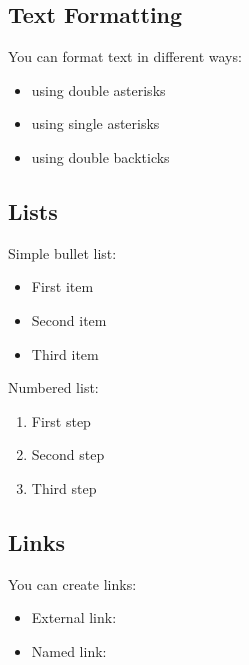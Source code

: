 \documentclass[letterpaper,10pt,english]{sphinxmanual}
\begin{document}
\subsection{Text Formatting}
\label{\detokenize{basic-elements:text-formatting}}
\sphinxAtStartPar
You can format text in different ways:
\begin{itemize}
\item {} 
\sphinxAtStartPar
{} using double asterisks

\item {} 
\sphinxAtStartPar
{} using single asterisks

\item {} 
\sphinxAtStartPar
{} using double backticks

\end{itemize}


\subsection{Lists}
\label{\detokenize{basic-elements:lists}}
\sphinxAtStartPar
Simple bullet list:
\begin{itemize}
\item {} 
\sphinxAtStartPar
First item

\item {} 
\sphinxAtStartPar
Second item

\item {} 
\sphinxAtStartPar
Third item

\end{itemize}

\sphinxAtStartPar
Numbered list:
\begin{enumerate}
%
\item {} 
\sphinxAtStartPar
First step

\item {} 
\sphinxAtStartPar
Second step

\item {} 
\sphinxAtStartPar
Third step

\end{enumerate}


\subsection{Links}
\label{\detokenize{basic-elements:links}}
\sphinxAtStartPar
You can create links:
\begin{itemize}
\item {} 
\sphinxAtStartPar
External link: 

\item {} 
\sphinxAtStartPar
Named link: 

\end{itemize}
\end{document}
